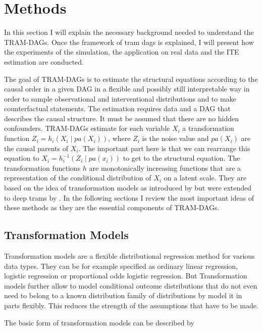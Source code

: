 



\chapter{Methods} 

In this section I will explain the necessary background needed to understand the TRAM-DAGs. Once the framework of tram dags is explained, I will present how the experiments of the simulation, the application on real data and the ITE estimation are conducted.


The goal of TRAM-DAGs is to estimate the structural equations according to the causal order in a given DAG in a flexible and possibly still interpretable way in order to sample observational and interventional distributions and to make counterfactual statements. The estimation requires data and a DAG that describes the causal structure. It must be assumed that there are no hidden confounders. TRAM-DAGs estimate for each variable $X_i$ a transformation function $Z_i = h_i(X_i \mid pa(X_i))$, where $Z_i$ is the noise value and $pa(X_i)$ are the causal parents of $X_i$. The important part here is that we can rearrange this equation to $X_i = h_i^{-1}(Z_i \mid pa(x_i))$ to get to the structural equation. The transformation functions $h$ are monotonically increasing functions that are a representation of the conditional distribution of $X_i$ on a latent scale. They are based on the idea of transformation models as introduced by \citet{hothorn2014} but were extended to deep trams by \citet{sick2020}. In the following sections I review the most important ideas of these methods as they are the essential components of TRAM-DAGs.

\section{Transformation Models}


Transformation models are a flexible distributional regression method for various data types. They can be for example specified as ordinary linear regression, logistic regression or proportional odds logistic regression. But Transformation models further allow to model conditional outcome distributions that do not even need to belong to a known distribution family of distributions by model it in parts flexibly. This reduces the strength of the assumptions that have to be made.

The basic form of transformation models can be described by

